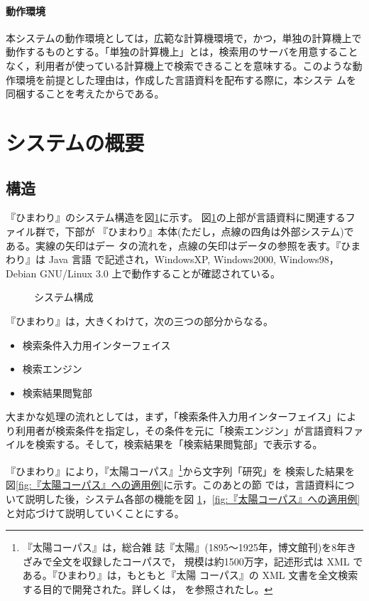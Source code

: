 \paragraph{動作環境}
本システムの動作環境としては，広範な計算機環境で，かつ，単独の計算機上で
動作するものとする。「単独の計算機上」とは，検索用のサーバを用意すること
なく，利用者が使っている計算機上で検索できることを意味する。このような動
作環境を前提とした理由は，作成した言語資料を配布する際に，本システ
ムを同梱することを考えたからである。


\section{システムの概要}
\subsection{構造}

『ひまわり』のシステム構造を図\ref{fig:システム構成}に示す。
図\ref{fig:システム構成}の上部が言語資料に関連するファイル群で，下部が
『ひまわり』本体(ただし，点線の四角は外部システム)である。実線の矢印はデー
タの流れを，点線の矢印はデータの参照を表す。『ひまわり』は Java 言語
で記述され\label{page:regex}，WindowsXP, Windows2000,
Windows98，Debian GNU/Linux 3.0 上で動作することが確認されている。


\begin{figure}[hbt]
 \begin{center}
  \epsfxsize=12.5cm
  \caption{システム構成}
  \label{fig:システム構成}
 \end{center}   
\end{figure}

『ひまわり』は，大きくわけて，次の三つの部分からなる。

\begin{itemize}
 \item 検索条件入力用インターフェイス
 \item 検索エンジン
 \item 検索結果閲覧部
\end{itemize}

大まかな処理の流れとしては，まず，「検索条件入力用インターフェイス」によ
り利用者が検索条件を指定し，その条件を元に「検索エンジン」が言語資料ファ
イルを検索する。そして，検索結果を「検索結果閲覧部」で表示する。

『ひまわり』により，『太陽コーパス』\footnote{『太陽コーパス』は，総合雑
誌『太陽』(1895〜1925年，博文館刊)を8年きざみで全文を収録したコーパスで，
規模は約1500万字，記述形式は XML である。『ひまわり』は，もともと『太陽
コーパス』の XML 文書を全文検索する目的で開発された。詳しくは，
を参照されたし。}から文字列「研究」を
検索した結果を図\ref{fig:『太陽コーパス』への適用例}に示す。このあとの節
では，言語資料について説明した後，システム各部の機能を図
\ref{fig:システム構成}，\ref{fig:『太陽コーパス』への適用例}と対応づけて説明していくことにする。


